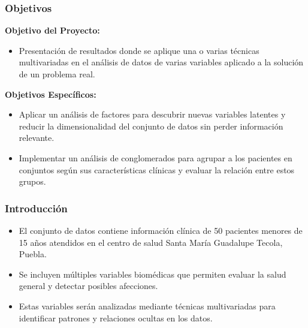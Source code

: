 \documentclass[
	11pt, %
]{beamer}
\begin{document}

\begin{frame}
    \frametitle{Objetivos} %
    \textbf{Objetivo del Proyecto:}
    \begin{itemize}
        \item Presentación de resultados donde se aplique una o varias técnicas multivariadas en el análisis de datos de varias variables aplicado a la solución de un problema real.
    \end{itemize}

    \vspace{0.5cm}

    \textbf{Objetivos Específicos:}
    \begin{itemize}
        \item Aplicar un análisis de factores para descubrir nuevas variables latentes y reducir la dimensionalidad del conjunto de datos sin perder información relevante.
        \item Implementar un análisis de conglomerados para agrupar a los pacientes en conjuntos según sus características clínicas y evaluar la relación entre estos grupos.
    \end{itemize}
\end{frame}


\begin{frame}
    \frametitle{Introducción} %
    \begin{itemize}
        \item El conjunto de datos contiene información clínica de 50 pacientes menores de 15 años atendidos en el centro de salud Santa María Guadalupe Tecola, Puebla.
        \item Se incluyen múltiples variables biomédicas que permiten evaluar la salud general y detectar posibles afecciones.
        \item Estas variables serán analizadas mediante técnicas multivariadas para identificar patrones y relaciones ocultas en los datos.
    \end{itemize}
\end{frame}
\end{document}
